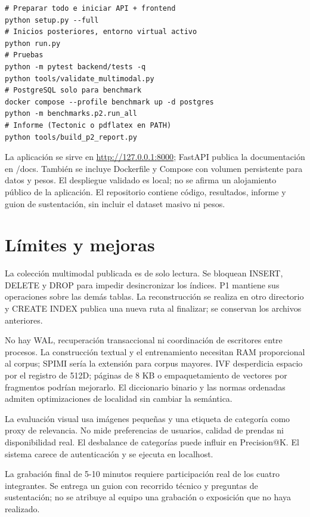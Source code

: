 \documentclass[11pt,a4paper]{article}
\begin{document}
\begin{lstlisting}
# Preparar todo e iniciar API + frontend
python setup.py --full
# Inicios posteriores, entorno virtual activo
python run.py
# Pruebas
python -m pytest backend/tests -q
python tools/validate_multimodal.py
# PostgreSQL solo para benchmark
docker compose --profile benchmark up -d postgres
python -m benchmarks.p2.run_all
# Informe (Tectonic o pdflatex en PATH)
python tools/build_p2_report.py
\end{lstlisting}

La aplicación se sirve en \url{http://127.0.0.1:8000}; FastAPI publica la documentación en /docs. También se incluye Dockerfile y Compose con volumen persistente para datos y pesos. El despliegue validado es local; no se afirma un alojamiento público de la aplicación. El repositorio contiene código, resultados, informe y guion de sustentación, sin incluir el dataset masivo ni pesos.

\section{Límites y mejoras}
La colección multimodal publicada es de solo lectura. Se bloquean INSERT, DELETE y DROP para impedir desincronizar los índices. P1 mantiene sus operaciones sobre las demás tablas. La reconstrucción se realiza en otro directorio y CREATE INDEX publica una nueva ruta al finalizar; se conservan los archivos anteriores.

No hay WAL, recuperación transaccional ni coordinación de escritores entre procesos. La construcción textual y el entrenamiento necesitan RAM proporcional al corpus; SPIMI sería la extensión para corpus mayores. IVF desperdicia espacio por el registro de 512D; páginas de 8 KB o empaquetamiento de vectores por fragmentos podrían mejorarlo. El diccionario binario y las normas ordenadas admiten optimizaciones de localidad sin cambiar la semántica.

La evaluación visual usa imágenes pequeñas y una etiqueta de categoría como proxy de relevancia. No mide preferencias de usuarios, calidad de prendas ni disponibilidad real. El desbalance de categorías puede influir en Precision@K. El sistema carece de autenticación y se ejecuta en localhost.

La grabación final de 5-10 minutos requiere participación real de los cuatro integrantes. Se entrega un guion con recorrido técnico y preguntas de sustentación; no se atribuye al equipo una grabación o exposición que no haya realizado.
\end{document}
